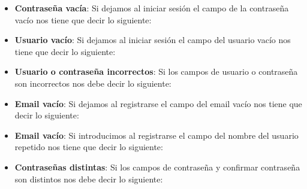 \begin{itemize}
	\item \textbf{Contraseña vacía}: Si dejamos al iniciar sesión el campo de la contraseña vacío nos tiene que decir lo siguiente:
	\item \textbf{Usuario vacío}: Si dejamos al iniciar sesión el campo del usuario vacío nos tiene que decir lo siguiente:
	\item \textbf{Usuario o contraseña incorrectos}: Si los campos de usuario o contraseña son incorrectos nos debe decir lo siguiente:
	\item \textbf{Email vacío}: Si dejamos al registrarse el campo del email vacío nos tiene que decir lo siguiente:
	\item \textbf{Email vacío}: Si introducimos al registrarse el campo del nombre del usuario repetido nos tiene que decir lo siguiente:
	\item \textbf{Contraseñas distintas}: Si los campos de contraseña y confirmar contraseña son distintos nos debe decir lo siguiente:
\end{itemize}